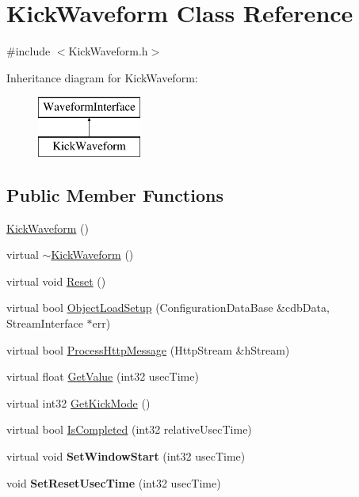 \hypertarget{classKickWaveform}{
\section{KickWaveform Class Reference}
\label{classKickWaveform}
}


{\ttfamily \#include $<$KickWaveform.h$>$}

Inheritance diagram for KickWaveform:\begin{figure}[H]
\begin{center}
\leavevmode
\includegraphics[height=2.000000cm]{classKickWaveform}
\end{center}
\end{figure}
\subsection*{Public Member Functions}
\begin{DoxyCompactItemize}
\item 
\hyperlink{classKickWaveform_a50fb828c1dd190b225e8e5f3631d6c36}{KickWaveform} ()
\item 
virtual \hyperlink{classKickWaveform_abe3fa01aac1a6a058630ace1744aa4f7}{$\sim$KickWaveform} ()
\item 
virtual void \hyperlink{classKickWaveform_a639370dfec04827ac91b8a38352432fa}{Reset} ()
\item 
virtual bool \hyperlink{classKickWaveform_aed9ccfd8e61b91743d2e74ac1273ffc3}{ObjectLoadSetup} (ConfigurationDataBase \&cdbData, StreamInterface $\ast$err)
\item 
virtual bool \hyperlink{classKickWaveform_a20044c2d0e8026b0957755b4128d1f92}{ProcessHttpMessage} (HttpStream \&hStream)
\item 
virtual float \hyperlink{classKickWaveform_a7a5fc20993a5a2b94481029f07a6118b}{GetValue} (int32 usecTime)
\item 
virtual int32 \hyperlink{classKickWaveform_a20cba441dd9e51c80b507a695b1b728f}{GetKickMode} ()
\item 
virtual bool \hyperlink{classKickWaveform_a65a2d2cc5a46daea138ee8212dfb9de0}{IsCompleted} (int32 relativeUsecTime)
\item 
\hypertarget{classKickWaveform_ab6d00b178ac4162f844231d85a3a8fe3}{
virtual void {\bfseries SetWindowStart} (int32 usecTime)}
\label{classKickWaveform_ab6d00b178ac4162f844231d85a3a8fe3}

\item 
\hypertarget{classKickWaveform_a88b8c9147808284eff71bd550333912b}{
void {\bfseries SetResetUsecTime} (int32 usecTime)}
\label{classKickWaveform_a88b8c9147808284eff71bd550333912b}

\end{DoxyCompactItemize}


